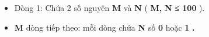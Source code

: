 \begin{itemize}
	\item     Dòng 1: Chứa 2 số nguyên    \textbf{     M    }    và    \textbf{     N    }    (    \textbf{     M,    }\textbf{     N    }\textbf{     ≤ 100    }    ).   
	\item \textbf{     M    }    dòng tiếp theo: mỗi dòng chứa    \textbf{     N    }    số    \textbf{     0    }    hoặc    \textbf{     1    }\textbf{     .    }
\end{itemize}